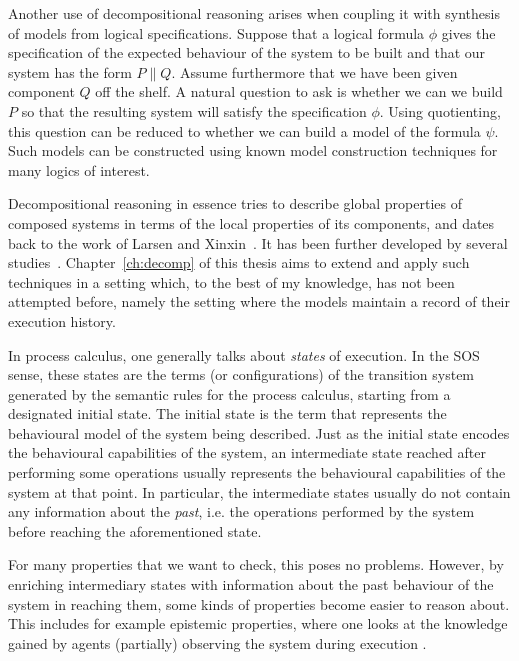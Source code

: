 Another use of decompositional reasoning arises when coupling it with synthesis 
of models from logical specifications. Suppose that a logical formula $\phi$ gives 
the specification of the expected behaviour of the system to be built and that 
our system has the form $P \parallel Q$. Assume furthermore that we have been given 
component $Q$ off the shelf. A natural question to ask is whether we can we build 
$P$ so that the resulting system will satisfy the specification $\phi$. Using 
quotienting, this question can be reduced to whether we can build a model of the
formula $\psi$. Such models can be constructed using known model construction 
techniques for many logics of interest. 

Decompositional reasoning in essence tries to describe global properties of
composed systems in terms of the local properties of its components, 
and dates back to the work of Larsen and Xinxin~\cite{Larsen91}.
It has been further developed by several studies~\cite{Giannakopoulou05,Xie05,Andersen95,LaroussinieL95}.
Chapter~\ref{ch:decomp} of this thesis aims to extend and apply such techniques
in a setting which, to the best of my knowledge, has not been attempted before,
namely the setting where the models maintain a record of their execution history.

\vspace{1em}

In process calculus, one generally talks about \emph{states} of execution. In the
SOS sense, these states are the terms (or configurations) of the transition system
generated by the semantic rules for the process calculus, starting from a designated
initial state. The initial state is the term that represents the behavioural model
of the system being described. Just as the initial state encodes the behavioural
capabilities of the system, an intermediate state reached after performing some
operations usually represents the behavioural capabilities of the system at that point.
In particular, the intermediate states usually do not contain any information about
the \emph{past}, i.e. the operations performed by the system before reaching 
the aforementioned state.

For many properties that we want to check, this poses no problems. However,
by enriching intermediary states with information about the past behaviour of 
the system in reaching them, some kinds of properties become easier to reason
about. This includes for example epistemic properties, where one looks at the
knowledge gained by agents (partially) observing the system during execution
\cite{Mousavi07-LPAR}.

